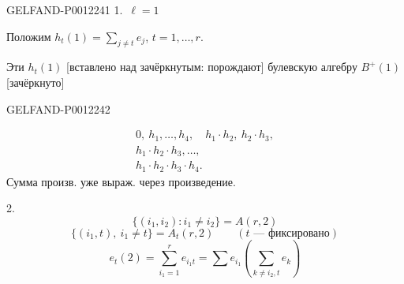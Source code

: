 \begin{GelfandAdjacentEvidence}{GELFAND-P001224}{1}
1.\ \underline{\(\ell=1\)}

Положим \(h_t(1)=\displaystyle\sum_{j\ne t}e_j\), \(t=1,\ldots,r\).

Эти \(h_t(1)\) [вставлено над зачёркнутым: порождают] булевскую алгебру
\(B^+(1)\) [зачёркнуто]
\end{GelfandAdjacentEvidence}
\begin{GelfandAdjacentEvidence}{GELFAND-P001224}{2}

\begin{equation*}
\begin{gathered}
0,\ h_1,\ldots,h_4,\quad h_1\cdot h_2,\ h_2\cdot h_3,\\
h_1\cdot h_2\cdot h_3,\ldots,\\
h_1\cdot h_2\cdot h_3\cdot h_4.
\end{gathered}
\end{equation*}
Сумма произв. уже выраж. через произведение.

2.\ 
\begin{equation*}
\{(i_1,i_2):i_1\ne i_2\}=A(r,2)
\end{equation*}
\begin{equation*}
\{(i_1,t),\ i_1\ne t\}=A_t(r,2)\qquad(t\text{ --- фиксировано})
\end{equation*}
\begin{equation*}
e_t(2)=\sum_{i_1=1}^{r}e_{i_1t}
=\sum e_{i_1}\left(\sum_{k\ne i_2,t}e_k\right)
\end{equation*}
\end{GelfandAdjacentEvidence}

